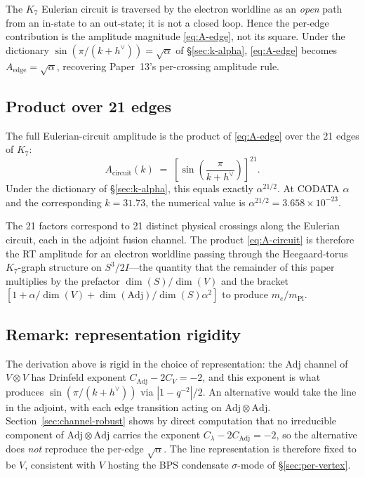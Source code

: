 \documentclass[11pt]{article}
\newcommand{\Adj}{\mathrm{Adj}}
\newcommand{\mPl}{m_{\mathrm{Pl}}}
\newcommand{\hv}{h^{\vee}}
\begin{document}
The $K_7$ Eulerian circuit is traversed by the electron
worldline as an \emph{open} path from an in-state to an
out-state; it is not a closed loop.  Hence the per-edge
contribution is the amplitude magnitude \eqref{eq:A-edge}, not its
square.  Under the dictionary $\sin(\pi/(k+\hv)) = \sqrt{\alpha}$
of \S\ref{sec:k-alpha}, \eqref{eq:A-edge} becomes
$A_{\mathrm{edge}} = \sqrt{\alpha}$, recovering Paper~13's
per-crossing amplitude rule.

\subsection{Product over 21 edges}
\label{sec:k7-product}

The full Eulerian-circuit amplitude is the product of
\eqref{eq:A-edge} over the 21 edges of $K_7$:
\begin{equation}
  A_{\mathrm{circuit}}(k)
  \;=\; \left[\sin\!\left(\frac{\pi}{k + \hv}\right)\right]^{21}.
  \label{eq:A-circuit}
\end{equation}
Under the dictionary of \S\ref{sec:k-alpha}, this equals exactly
$\alpha^{21/2}$.  At CODATA $\alpha$ and the corresponding
$k = 31.73$, the numerical value is
$\alpha^{21/2} = 3.658 \times 10^{-23}$.

The 21 factors correspond to 21 distinct physical crossings along
the Eulerian circuit, each in the adjoint fusion channel.  The
product \eqref{eq:A-circuit} is therefore the RT amplitude for an
electron worldline passing through the Heegaard-torus
$K_7$-graph structure on $S^3/2I$---the quantity that the
remainder of this paper multiplies by the prefactor
$\dim(S)/\dim(V)$ and the bracket
$[1 + \alpha/\dim(V) + \dim(\Adj)/\dim(S) \alpha^2]$ to produce
$m_e/\mPl$.

\subsection{Remark: representation rigidity}

The derivation above is rigid in the choice of representation:
the Adj channel of $V \otimes V$ has Drinfeld exponent
$C_\Adj - 2 C_V = -2$, and this exponent is what produces
$\sin(\pi/(k+\hv))$ via $|1 - q^{-2}|/2$.  An alternative would
take the line in the adjoint, with each edge transition acting
on $\Adj \otimes \Adj$.  Section~\ref{sec:channel-robust} shows
by direct computation that no irreducible component of
$\Adj \otimes \Adj$ carries the exponent $C_\lambda - 2 C_\Adj
= -2$, so the alternative does \emph{not} reproduce the per-edge
$\sqrt{\alpha}$.  The line representation is therefore fixed
to be $V$, consistent with $V$ hosting the BPS condensate
$\sigma$-mode of \S\ref{sec:per-vertex}.
\end{document}
